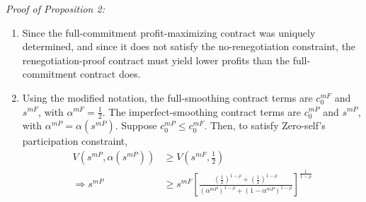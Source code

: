 \documentclass[11pt,english]{article}
\theoremstyle{plain}
\theoremstyle{definition}
\begin{document}
\textit{Proof of Proposition 2:}
\begin{enumerate} [label=\alph*)]
\item Since the full-commitment profit-maximizing
contract was uniquely determined, and since it does not satisfy the
no-renegotiation constraint, the renegotiation-proof contract
must yield lower profits than the full-commitment contract does.

\item Using the modified notation, the full-smoothing contract terms
are $c_{0}^{mF}$ and $s^{mF}$, with $\alpha^{mF}=\frac{1}{2}$.
The imperfect-smoothing contract terms are $c_{0}^{mP}$ and $s^{mP}$,
with $\alpha^{mP}=\alpha\left(s^{mP}\right)$. Suppose $c_{0}^{mP}\leq c_{0}^{mF}$.
Then, to satisfy Zero-self's participation constraint, 
\begin{align}
V\left(s^{mP},\alpha\left(s^{mP}\right)\right) & \geq V\left(s^{mF},\frac{1}{2}\right)\\
\Rightarrow s^{mP} & \geq s^{mF}\left[\frac{\left(\frac{1}{2}\right)^{1-\rho}+\left(\frac{1}{2}\right)^{1-\rho}}{\left(\alpha^{mP}\right)^{1-\rho}+\left(1-\alpha^{mP}\right)^{1-\rho}}\right]^{\frac{1}{1-\rho}}\label{eq:s-compare}
\end{align}


\end{enumerate}
\end{document}
